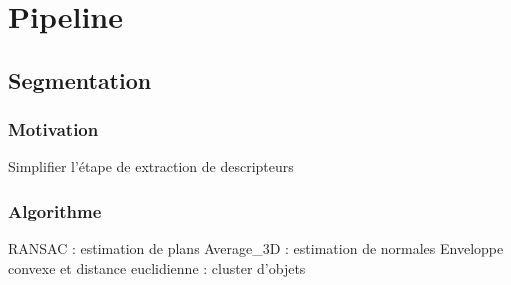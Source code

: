 \section{Pipeline}

    \subsection{Segmentation}

        \subsubsection{Motivation}
            Simplifier l'étape de extraction de descripteurs

        \subsubsection{Algorithme}
            RANSAC : estimation de plans
            Average_3D : estimation de normales
            Enveloppe convexe et distance euclidienne : cluster d'objets
            
